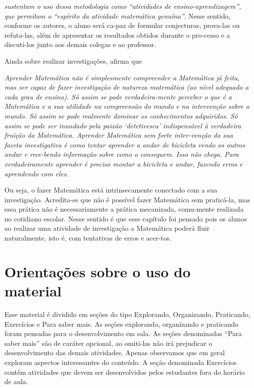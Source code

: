 \begin{apresentacao}
{\cite[p.23]{Ponte1} \textit{sustentam o uso dessa metodologia como “atividades de ensino-aprendizagem”, que permitam o “espírito da atividade matemática genuína”}. Nesse sentido, conforme os autores, o aluno será ca-paz de formular conjecturas, prova-las ou refuta-las, além de apresentar os resultados obtidos durante o pro-cesso e a discuti-los junto aos demais colegas e ao professor.

Ainda sobre realizar investigações, \cite[p.5]{Braumann} afirma que 

\textit{Aprender Matemática não é simplesmente compreender a Matemática já feita, mas ser capaz de fazer investigação de natureza matemática (ao nível adequado a cada grau de ensino). Só assim se pode verdadeira-mente perceber o que é a Matemática e a sua utilidade na compreensão do mundo e na intervenção sobre o mundo. Só assim se pode realmente dominar os conhecimentos adquiridos. Só assim se pode ser inundado pela paixão ‘detetivesca’ indispensável à verdadeira fruição da Matemática. Aprender Matemática sem forte inter-venção da sua faceta investigativa é como tentar aprender a andar de bicicleta vendo os outros andar e rece-bendo informação sobre como o conseguem. Isso não chega. Para verdadeiramente aprender é preciso montar a bicicleta e andar, fazendo erros e aprendendo com eles.} 

Ou seja, o fazer Matemática está intrinsecamente conectado com a sua investigação. Acredita-se que não é possível fazer Matemática sem praticá-la, mas essa prática não é necessariamente a prática mecanizada, comu-mente realizada no cotidiano escolar. Nesse sentido é que esse capítulo foi pensado pois os alunos ao realizar uma atividade de investigação a Matemática poderá fluir naturalmente, isto é, com tentativas de erros e acer-tos. 

\section*{Orientações sobre o uso do material}

Esse material é dividido em seções do tipo Explorando, Organizando, Praticando, Exercícios e Para saber mais. As seções explorando, organizando e praticando foram pensadas para o desenvolvimento em sala. As seções denominadas “Para saber mais” são de caráter opcional, ao omiti-las não irá prejudicar o desenvolvimento das demais atividades. Apenas observamos que em geral  exploram aspectos interessantes do conteúdo. A seção denominada Exercícios contém atividades que devem ser desenvolvidos pelos estudantes fora do horário de aula. 

}
\end{apresentacao}
